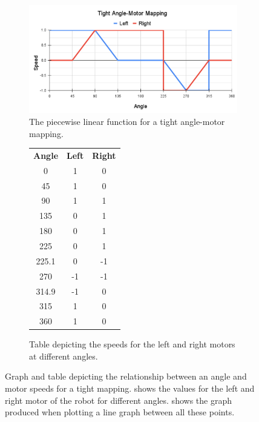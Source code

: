 \documentclass{l4proj}
\begin{document}
\begin{figure}[!h]
    \centering
    \begin{subfigure}[b]{0.75\textwidth}
        \includegraphics[width=\textwidth]{images/Tight Angle-Motor Mapping.pdf}
        \caption{The piecewise linear function for a tight angle-motor mapping.}
        \label{fig:tight-mapping-graph}
    \end{subfigure}
    \begin{subfigure}[b]{0.24\textwidth}
        \begin{tabular}{ccc}
            \textbf{Angle} & \textbf{Left} & \textbf{Right} \\
            0 & 1 & 0 \\
            45 & 1 & 0 \\
            90 & 1 & 1 \\
            135 & 0 & 1 \\
            180 & 0 & 1 \\
            225 & 0 & 1 \\
            225.1 & 0 & -1 \\
            270 & -1 & -1 \\
            314.9 & -1 & 0 \\
            315 & 1 & 0 \\
            360 & 1 & 0
        \end{tabular}
        \caption{Table depicting the speeds for the left and right motors at different angles.}
        \label{tab:tight-mapping-table}
    \end{subfigure}
    \caption{Graph and table depicting the relationship between an angle and motor speeds for a tight mapping.  shows the values for the left and right motor of the robot for different angles.  shows the graph produced when plotting a line graph between all these points.}
    \label{fig:tight-mapping}
\end{figure}
\end{document}
